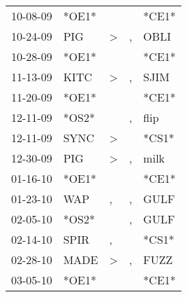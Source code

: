 \begin{supertabular}{p{0.07\textwidth}p{0.06\textwidth}p{0.02\textwidth}p{0.02\textwidth}p{0.06\textwidth}}
          10-08-09\textsuperscript{} &                            *OE1* &                  &                  &                            *CE1* \\
          10-24-09\textsuperscript{} &            PIG\textsuperscript{} &     \textgreater &                , &           OBLI\textsuperscript{} \\
          10-28-09\textsuperscript{} &                            *OE1* &                  &                  &                            *CE1* \\
          11-13-09\textsuperscript{} &           KITC\textsuperscript{} &     \textgreater &                , &           SJIM\textsuperscript{} \\
          11-20-09\textsuperscript{} &                            *OE1* &                  &                  &                            *CE1* \\
          12-11-09\textsuperscript{} &                            *OS2* &                  &                , &           flip\textsuperscript{} \\
          12-11-09\textsuperscript{} &           SYNC\textsuperscript{} &     \textgreater &                  &                            *CS1* \\
          12-30-09\textsuperscript{} &            PIG\textsuperscript{} &     \textgreater &                , &           milk\textsuperscript{} \\
          01-16-10\textsuperscript{} &                            *OE1* &                  &                  &                            *CE1* \\
          01-23-10\textsuperscript{} &            WAP\textsuperscript{} &                , &                , &           GULF\textsuperscript{} \\
          02-05-10\textsuperscript{} &                            *OS2* &                  &                , &           GULF\textsuperscript{} \\
          02-14-10\textsuperscript{} &           SPIR\textsuperscript{} &                , &                  &                            *CS1* \\
          02-28-10\textsuperscript{} &           MADE\textsuperscript{} &     \textgreater &                , &           FUZZ\textsuperscript{} \\
          03-05-10\textsuperscript{} &                            *OE1* &                  &                  &                            *CE1* \\

\end{supertabular}
